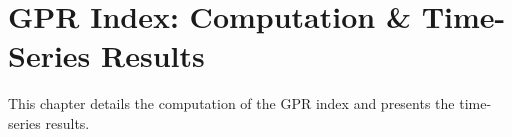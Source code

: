 
\chapter{GPR Index: Computation \& Time-Series Results}

This chapter details the computation of the GPR index and presents the time-series results.

